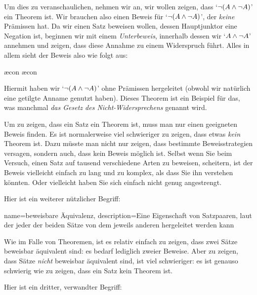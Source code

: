 Um dies zu veranschaulichen, nehmen wir an, wir wollen zeigen, dass `$\neg (A \wedge \neg A)$' ein Theorem ist. Wir brauchen also einen Beweis für `$\neg (A \wedge \neg A)$', der \emph{keine} Prämissen hat. Da wir einen Satz beweisen wollen, dessen Hauptjunktor eine Negation ist, beginnen wir mit einem \emph{Unterbeweis}, innerhalb dessen wir `$A \wedge \neg A$' annehmen und zeigen, dass diese Annahme zu einem Widerspruch führt. Alles in allem sieht der Beweis also wie folgt aus:
	\begin{fitchproof}
		\open
			\ae{con}
			\ae{con}
		\close
	\end{fitchproof}
Hiermit haben wir `$\neg (A \wedge \neg A)$' ohne Prämissen hergeleitet (obwohl wir natürlich eine getilgte Anname genutzt haben). Dieses Theorem ist ein Beispiel für das, was manchmal \emph{das Gesetz des Nicht-Widersprechens} genannt wird.

Um zu zeigen, dass ein Satz ein Theorem ist, muss man nur einen geeigneten Beweis finden. Es ist normalerweise viel schwieriger zu zeigen, dass etwas \emph{kein} Theorem ist. Dazu müsste man nicht nur zeigen, dass bestimmte Beweisstrategien versagen, sondern auch, dass kein Beweis möglich ist. Selbst wenn Sie beim Versuch, einen Satz auf tausend verschiedene Arten zu beweisen, scheitern, ist der Beweis vielleicht einfach zu lang und zu komplex, als dass Sie ihn verstehen könnten. Oder vielleicht haben Sie sich einfach nicht genug angestrengt.

Hier ist ein weiterer nützlicher Begriff:
        
{
  name=beweisbare Äquivalenz,
description={Eine Eigenschaft von Satzpaaren, laut der jeder der beiden Sätze von dem jeweils anderen hergeleitet werden kann}
}

Wie im Falle von Theoremen, ist es relativ einfach zu zeigen, dass zwei Sätze beweisbar äquivalent sind: es bedarf lediglich zweier Beweise. Aber zu zeigen, dass Sätze \emph{nicht} beweisbar äquivalent sind, ist viel schwieriger: es ist genauso schwierig wie zu zeigen, dass ein Satz kein Theorem ist. 

Hier ist ein dritter, verwandter Begriff:
        
